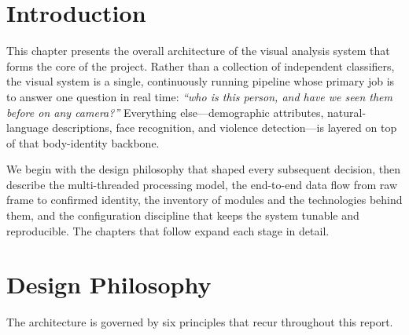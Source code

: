 \documentclass[12pt]{report}
\begin{document}
\section{Introduction}
This chapter presents the overall architecture of the visual analysis system that forms the core of the project. Rather than a collection of independent classifiers, the visual system is a single, continuously running pipeline whose primary job is to answer one question in real time: \emph{``who is this person, and have we seen them before on any camera?''} Everything else---demographic attributes, natural-language descriptions, face recognition, and violence detection---is layered on top of that body-identity backbone.

We begin with the design philosophy that shaped every subsequent decision, then describe the multi-threaded processing model, the end-to-end data flow from raw frame to confirmed identity, the inventory of modules and the technologies behind them, and the configuration discipline that keeps the system tunable and reproducible. The chapters that follow expand each stage in detail.

\section{Design Philosophy}
The architecture is governed by six principles that recur throughout this report.
\end{document}
